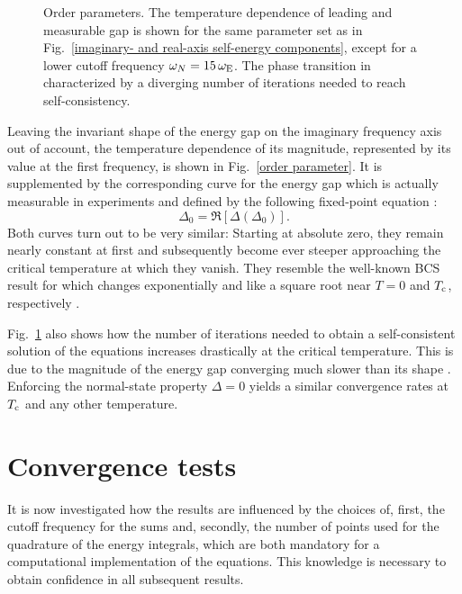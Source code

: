 \begin{figure}
    \small
    \centering
    
    \caption[Temperature dependence of the order parameter]{
        Order parameters. The temperature dependence of leading 
        and measurable gap is shown for the same parameter set as in
        Fig.~\ref{imaginary- and real-axis self-energy components}, except for a
        lower cutoff frequency $\omega_N = 15 \, \omega \sb{\text{E}}$. The phase
        transition in characterized by a diverging number of iterations needed
        to reach self-consistency.}
    \label{order parameter}
\end{figure}
%
Leaving the invariant shape of the energy gap on the imaginary frequency axis
out of account, the temperature dependence of its magnitude, represented by its
value at the first  frequency, is shown in Fig.~\ref{order
parameter}. It is supplemented by the corresponding curve for the energy gap
which is actually measurable in experiments and defined by the following
fixed-point equation \cite[Eq.~3a]{VidbergSerene77}:
%
\begin{equation} \label{measurable gap}
    \Delta_0 = \Re[\Delta(\Delta_0)].
\end{equation}
%
Both curves turn out to be very similar: Starting at absolute zero, they remain
nearly constant at first and subsequently become ever steeper approaching the
critical temperature at which they vanish. They resemble the well-known BCS
result for which changes exponentially and like a square root near $T = 0$ and
$T \sb{\text{c}}$, respectively \cite[Eq.~11.60]{Czycholl08}.

Fig.~\ref{order parameter} also shows how the number of iterations needed to
obtain a self-consistent solution of the  equations increases
drastically at the critical temperature. This is due to the magnitude of the
energy gap converging much slower than its shape \cite[185]{VidbergSerene77}.
Enforcing the normal-state property $\Delta = 0$ yields a similar convergence
rates at $T \sb{\text{c}}$ and any other temperature.

\section{Convergence tests}

It is now investigated how the results are influenced by the choices of, first,
the cutoff frequency for the  sums and, secondly, the number of
points used for the quadrature of the energy integrals, which are both mandatory
for a computational implementation of the  equations. This
knowledge is necessary to obtain confidence in all subsequent results.

